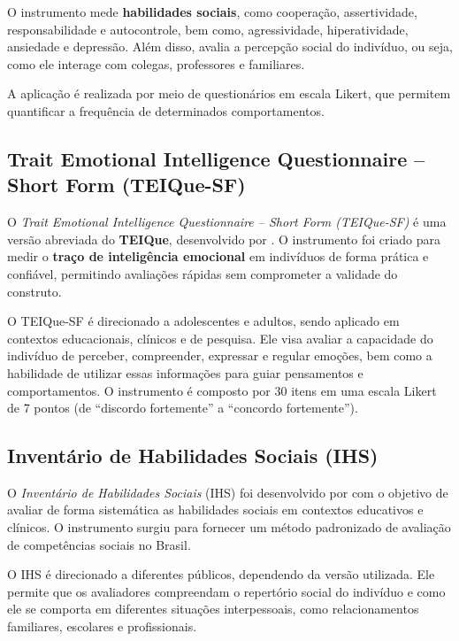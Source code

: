             O instrumento mede \textbf{habilidades sociais}, como cooperação, assertividade, responsabilidade e autocontrole, bem como, agressividade, hiperatividade, ansiedade e depressão. Além disso, avalia a percepção social do indivíduo, ou seja, como ele interage com colegas, professores e familiares.

            A aplicação é realizada por meio de questionários em escala Likert, que permitem quantificar a frequência de determinados comportamentos.

        \subsection{Trait Emotional Intelligence Questionnaire – Short Form (TEIQue-SF)}

            O \textit{Trait Emotional Intelligence Questionnaire – Short Form (TEIQue-SF)} é uma versão abreviada do \textbf{TEIQue}, desenvolvido por \cite{Petrides2009}. O instrumento foi criado para medir o \textbf{traço de inteligência emocional} em indivíduos de forma prática e confiável, permitindo avaliações rápidas sem comprometer a validade do construto.

            O TEIQue-SF é direcionado a adolescentes e adultos, sendo aplicado em contextos educacionais, clínicos e de pesquisa. Ele visa avaliar a capacidade do indivíduo de perceber, compreender, expressar e regular emoções, bem como a habilidade de utilizar essas informações para guiar pensamentos e comportamentos. O instrumento é composto por 30 itens em uma escala Likert de 7 pontos (de ``discordo fortemente'' a ``concordo fortemente'').

        \subsection{Inventário de Habilidades Sociais (IHS)}

            O \textit{Inventário de Habilidades Sociais} (IHS) foi desenvolvido por \cite{DelPretteDelPrette2002} com o objetivo de avaliar de forma sistemática as habilidades sociais em contextos educativos e clínicos. O instrumento surgiu para fornecer um método padronizado de avaliação de competências sociais no Brasil.

            O IHS é direcionado a diferentes públicos, dependendo da versão utilizada. Ele permite que os avaliadores compreendam o repertório social do indivíduo e como ele se comporta em diferentes situações interpessoais, como relacionamentos familiares, escolares e profissionais.

